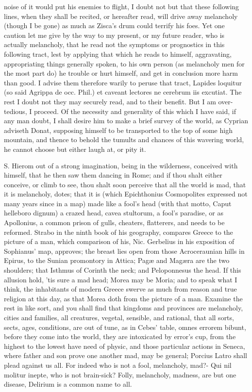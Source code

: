 {noise of it would put his enemies to flight, I doubt not but that these
following lines, when they shall be recited, or hereafter read, will
drive away melancholy (though I be gone) as much as Zisca's drum could
terrify his foes. Yet one caution let me give by the way to my present,
or my future reader, who is actually melancholy, that he read not the
symptoms or prognostics in this following tract, lest by applying
that which he reads to himself, aggravating, appropriating things
generally spoken, to his own person (as melancholy men for the most
part do) he trouble or hurt himself, and get in conclusion more harm
than good. I advise them therefore warily to peruse that tract, Lapides
loquitur (so said Agrippa de occ. Phil.) et caveant lectores ne
cerebrum iis excutiat. The rest I doubt not they may securely read, and
to their benefit. But I am over-tedious, I proceed.
Of the necessity and generality of this which I have said, if any man
doubt, I shall desire him to make a brief survey of the world, as 
Cyprian adviseth Donat, supposing himself to be transported to the top
of some high mountain, and thence to behold the tumults and chances of
this wavering world, he cannot choose but either laugh at, or pity it.

S. Hierom out of a strong imagination, being in the wilderness,
conceived with himself, that he then saw them dancing in Rome; and if
thou shalt either conceive, or climb to see, thou shalt soon perceive
that all the world is mad, that it is melancholy, dotes; that it is
(which Epichthonius Cosmopolites expressed not many years since in a
map) made like a fool's head (with that motto, Caput helleboro dignum)
a crazed head, cavea stultorum, a fool's paradise, or as Apollonius, a
common prison of gulls, cheaters, flatterers, \etc and needs to be
reformed. Strabo in the ninth book of his geography, compares Greece to
the picture of a man, which comparison of his, Nic. Gerbelius in his
exposition of Sophianus' map, approves; the breast lies open from those
Acroceraunian hills in Epirus, to the Sunian promontory in Attica;
Pag\ae{} and Mag\ae{}ra are the two shoulders; that Isthmus of Corinth the
neck; and Peloponnesus the head. If this allusion hold, 'tis sure a mad
head; Morea may be Moria; and to speak what I think, the inhabitants of
modern Greece swerve as much from reason and true religion at this day,
as that Morea doth from the picture of a man. Examine the rest in like
sort, and you shall find that kingdoms and provinces are melancholy,
cities and families, all creatures, vegetal, sensible, and rational,
that all sorts, sects, ages, conditions, are out of tune, as in Cebes'
table, omnes errorem bibunt, before they come into the world, they are
intoxicated by error's cup, from the highest to the lowest have need of
physic, and those particular actions in Seneca, where father and
son prove one another mad, may be general; Porcius Latro shall plead
against us all. For indeed who is not a fool, melancholy, mad?-
Qui nil molitur inepte, who is not brain-sick? Folly, melancholy,
madness, are but one disease, Delirium is a common name to all.

}
